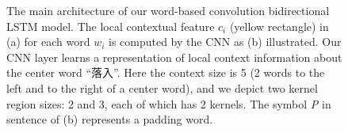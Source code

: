 \begin{figure}
\centering
{}

\caption{The main architecture of our word-based convolution bidirectional LSTM model. The local contextual feature $c_{i}$ (yellow rectangle) in (a) for each word $w_i$ is computed by the CNN as (b) illustrated. Our CNN layer learns a representation of local context information about the center word ``落入''. Here the context size is 5 (2 words to the left and to the right of a center word), and we depict two kernel region sizes: 2 and 3, each of which has 2 kernels. The symbol \emph{P} in sentence of (b) represents a padding word.\label{fig:1}}

\end{figure}

